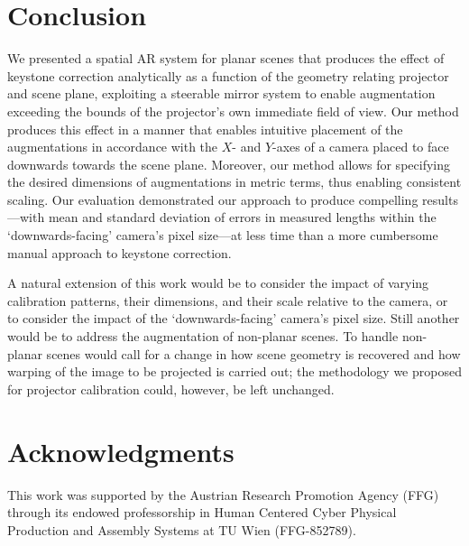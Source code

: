 \documentclass[review]{elsarticle}
\begin{document}
\section{Conclusion}

We presented a spatial AR system for planar scenes that produces the effect of keystone correction analytically as a function of the geometry relating projector and scene plane, exploiting a steerable mirror system to enable augmentation exceeding the bounds of the projector's own immediate field of view. Our method produces this effect in a manner that enables intuitive placement of the augmentations in accordance with the $X$- and $Y$-axes of a camera placed to face downwards towards the scene plane. Moreover, our method allows for specifying the desired dimensions of augmentations in metric terms, thus enabling consistent scaling. Our evaluation demonstrated our approach to produce compelling results---with mean and standard deviation of errors in measured lengths within the `downwards-facing' camera's pixel size---at less time than a more cumbersome manual approach to keystone correction.

A natural extension of this work would be to consider the impact of varying calibration patterns, their dimensions, and their scale relative to the camera, or to consider the impact of the `downwards-facing' camera's pixel size. Still another would be to address the augmentation of non-planar scenes. To handle non-planar scenes would call for a change in how scene geometry is recovered and how warping of the image to be projected is carried out; the methodology we proposed for projector calibration could, however, be left unchanged.

\section{Acknowledgments}

This work was supported by the Austrian Research Promotion Agency (FFG) through its endowed professorship in Human Centered Cyber Physical Production and Assembly Systems at TU Wien (FFG-852789).


\end{document}
